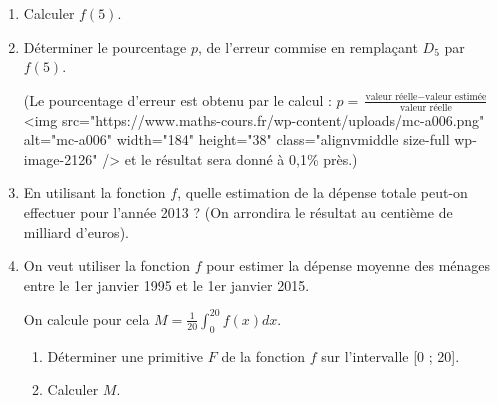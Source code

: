 \begin{enumerate}
     \item
     Calculer $f\left(5\right)$.
     \item
     Déterminer le pourcentage $p$, de l'erreur commise en remplaçant $D_{5}$ par $f\left(5\right)$.
     \par
     (Le pourcentage d'erreur est obtenu par le calcul : $p=$\nosp$\frac{\text{valeur réelle} - \text{valeur estimée}}{\text{valeur réelle}}$<img src="https://www.maths-cours.fr/wp-content/uploads/mc-a006.png" alt="mc-a006" width="184" height="38" class="alignvmiddle size-full wp-image-2126" />	et le résultat
     sera donné à 0,1\% près.)
     \item
     En utilisant la fonction $f$, quelle estimation de la dépense totale peut-on effectuer pour l'année 2013 ? (On arrondira le résultat au centième de milliard d'euros).
     \item
     On veut utiliser la fonction $f$ pour estimer la dépense moyenne des ménages entre le 1er janvier 1995 et le 1er janvier 2015.
     \par
     On calcule pour cela $M=\frac{1}{20} \int_{0}^{20} f\left(x\right)dx$.
     \begin{enumerate}[label=\alph*.]
          \item
          Déterminer une primitive $F$ de la fonction $f$ sur l'intervalle [0 ; 20].
          \item
     Calculer $M$.\end{enumerate}
\end{enumerate}
